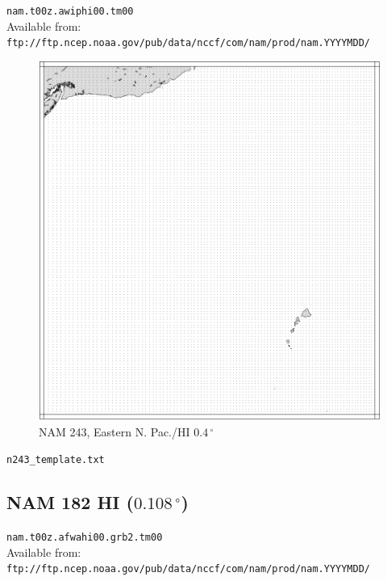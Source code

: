 \documentclass[11pt]{article}   %
\begin{document}
\verb|nam.t00z.awiphi00.tm00|\\
Available from:\\
\verb|ftp://ftp.ncep.noaa.gov/pub/data/nccf/com/nam/prod/nam.YYYYMDD/|

\begin{figure}[htbp]\begin{center}
 \includegraphics[angle=-90,scale=0.9]{Figs/n243.pdf}
\parbox{15cm}{\caption{\label{FigNAM243}
NAM 243, Eastern N. Pac./HI $0.4 \, ^{\circ}$
}}
\end{center}\end{figure}
\clearpage
\verb|n243_template.txt| \\
\tiny  \normalsize

\clearpage
\subsection{NAM 182 HI ($0.108  \, ^{\circ}$)}

\verb|nam.t00z.afwahi00.grb2.tm00|\\
Available from:\\
\verb|ftp://ftp.ncep.noaa.gov/pub/data/nccf/com/nam/prod/nam.YYYYMDD/|
\end{document}
